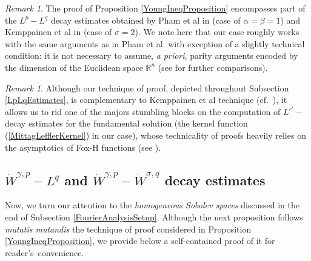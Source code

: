 \documentclass{amsart}
\theoremstyle{definition}
\theoremstyle{remark}
\newtheorem{remark}[theorem]{Remark}
\numberwithin{equation}{section}
\newcommand{\BR}{{\mathbb R}}
\begin{document}
\begin{remark}
	The proof of Proposition \ref{YoungIneqProposition} encompasses part of the $L^p-L^q$ decay estimates obtained by Pham et al in \cite[Section 2.]{PMR15} (case of $\alpha=\beta=1$) and Kemppainen et al in \cite[Section 3.1]{KSZ17} (case of $\sigma=2$). We note here that our case roughly works with the same arguments as in Pham et al. with exception of a slightly technical condition: it is not necessary to assume, {\it a priori}, parity arguments encoded by the dimension of the Euclidean space $\BR^n$ (see \cite[pp.~573-576]{PMR15} for further comparisons).
\end{remark}

\begin{remark}
	Although our technique of proof, depicted throughout Subsection \ref{LpLqEstimates}, is complementary to Kemppainen et al technique (cf.~\cite[Section 5]{KSZ17}), it allows us to rid one of the majors stumbling blocks on the computation of $L^{r'}-$decay estimates for the fundamental solution (the kernel function (\ref{MittagLefflerKernel}) in our case), whose technicality of proofs heavily relies on the asymptotics of Fox-H functions (see \cite[Section 3]{KSZ17}).
\end{remark}





\subsection{$\dot{W}^{\gamma,p}-L^q$ and $\dot{W}^{\gamma,p}-\dot{W}^{\sigma,q}$ decay estimates}\label{SobolevEstimates}

Now, we turn our attention to the {\it homogeneous Sobolev spaces} discussed in the end of Subsection \ref{FourierAnalysisSetup}. Although the next proposition follows {\it mutatis mutandis} the technique of proof considered in Proposition \ref{YoungIneqProposition}, we provide below a self-contained proof of it for reader's~convenience.
\end{document}
